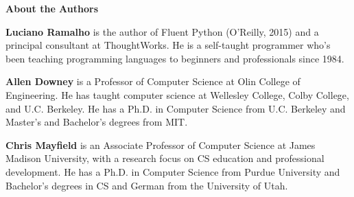 \documentclass[12pt]{book}
\theoremstyle{exercise}
\begin{document}

\fi



\mainmatter




\appendix
{}

\renewcommand{\chaptermark}[1]{\markboth{Appendix \thechapter ~~ #1}{}}




\backmatter

\printindex

\newpage
\thispagestyle{empty}

\vspace*{64pt}

{\bf\huge About the Authors}

\vspace*{40pt}

{\bf Luciano Ramalho} is the author of Fluent Python (O'Reilly, 2015) and a principal consultant at ThoughtWorks.
He is a self-taught programmer who's been teaching programming languages to beginners and professionals since 1984.

{\bf Allen Downey} is a Professor of Computer Science at Olin College of Engineering.
He has taught computer science at Wellesley College, Colby College, and U.C. Berkeley.
He has a Ph.D. in Computer Science from U.C. Berkeley and Master's and Bachelor's degrees from MIT.

{\bf Chris Mayfield} is an Associate Professor of Computer Science at James Madison University, with a research focus on CS education and professional development.
He has a Ph.D. in Computer Science from Purdue University and Bachelor's degrees in CS and German from the University of Utah.
\end{document}
